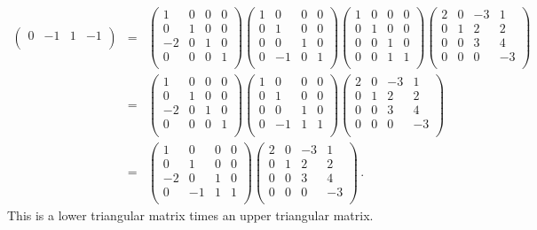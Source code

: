 \begin{example}
\begin{eqnarray*}
\begin{pmatrix}
0&-1&1&-1\\
\end{pmatrix}
\!\!\!\!\!\!&=&\!\!\!\!\!\!
\begin{pmatrix}
1&0&0&0\\
0&1&0&0\\
-2&0&1&0\\
0&0&0&1\\
\end{pmatrix} \!\!\!
\begin{pmatrix}
1&0&0&0\\
0&1&0&0\\
0&0&1&0\\
0&-1&0&1\\
\end{pmatrix}\!\!\!
\begin{pmatrix}
1&0&0&0\\
0&1&0&0\\
0&0&1&0\\
0&0&1&1\\
\end{pmatrix}\!\!\!
\begin{pmatrix}
2&0&-3&1\\
0&1&2&2\\
0&0&3&4\\
0&0&0&-3\\
\end{pmatrix}
\\
&=&\!\!\!\!
\begin{pmatrix}
1&0&0&0\\
0&1&0&0\\
-2&0&1&0\\
0&0&0&1\\
\end{pmatrix} 
\begin{pmatrix}
1&0&0&0\\
0&1&0&0\\
0&0&1&0\\
0&-1&1&1\\
\end{pmatrix}
\begin{pmatrix}
2&0&-3&1\\
0&1&2&2\\
0&0&3&4\\
0&0&0&-3\\
\end{pmatrix}
\\
&=&\!\!\!\!
\begin{pmatrix}
1&0&0&0\\
0&1&0&0\\
-2&0&1&0\\
0&-1&1&1\\
\end{pmatrix} 
%
\begin{pmatrix}
2&0&-3&1\\
0&1&2&2\\
0&0&3&4\\
0&0&0&-3\\
\end{pmatrix} \, .
\end{eqnarray*}
This is a lower triangular matrix times an upper triangular matrix. 
\end{example}

